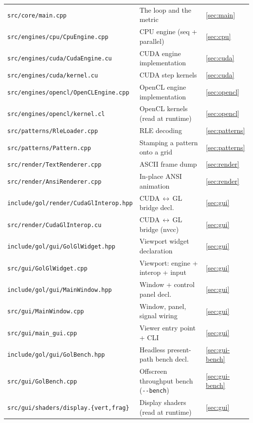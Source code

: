 \documentclass[
	english,
	letterpaper, oneside
]{article}
\begin{document}
\begin{table}[H]
\begin{tabular}{@{}lll@{}}
		\texttt{src/core/main.cpp}               & The loop and the metric & \ref{sec:main} \\
		\texttt{src/engines/cpu/CpuEngine.cpp}   & CPU engine (seq + parallel) & \ref{sec:cpu} \\
		\texttt{src/engines/cuda/CudaEngine.cu}  & CUDA engine implementation & \ref{sec:cuda} \\
		\texttt{src/engines/cuda/kernel.cu}      & CUDA step kernels & \ref{sec:cuda} \\
		\texttt{src/engines/opencl/OpenCLEngine.cpp} & OpenCL engine implementation & \ref{sec:opencl} \\
		\texttt{src/engines/opencl/kernel.cl}    & OpenCL kernels (read at runtime) & \ref{sec:opencl} \\
		\texttt{src/patterns/RleLoader.cpp}      & RLE decoding & \ref{sec:patterns} \\
		\texttt{src/patterns/Pattern.cpp}        & Stamping a pattern onto a grid & \ref{sec:patterns} \\
		\texttt{src/render/TextRenderer.cpp}     & ASCII frame dump & \ref{sec:render} \\
		\texttt{src/render/AnsiRenderer.cpp}     & In-place ANSI animation & \ref{sec:render} \\
		\texttt{include/gol/render/CudaGlInterop.hpp} & CUDA\,$\leftrightarrow$\,GL bridge decl. & \ref{sec:gui} \\
		\texttt{src/render/CudaGlInterop.cu}     & CUDA\,$\leftrightarrow$\,GL bridge (nvcc) & \ref{sec:gui} \\
		\texttt{include/gol/gui/GolGlWidget.hpp}  & Viewport widget declaration & \ref{sec:gui} \\
		\texttt{src/gui/GolGlWidget.cpp}          & Viewport: engine + interop + input & \ref{sec:gui} \\
		\texttt{include/gol/gui/MainWindow.hpp}   & Window + control panel decl. & \ref{sec:gui} \\
		\texttt{src/gui/MainWindow.cpp}           & Window, panel, signal wiring & \ref{sec:gui} \\
		\texttt{src/gui/main\_gui.cpp}            & Viewer entry point + CLI & \ref{sec:gui} \\
		\texttt{include/gol/gui/GolBench.hpp}     & Headless present-path bench decl. & \ref{sec:gui-bench} \\
		\texttt{src/gui/GolBench.cpp}             & Offscreen throughput bench (\texttt{-{}-bench}) & \ref{sec:gui-bench} \\
		\texttt{src/gui/shaders/display.\{vert,frag\}} & Display shaders (read at runtime) & \ref{sec:gui} \\

\end{tabular}
\end{table}
\end{document}
